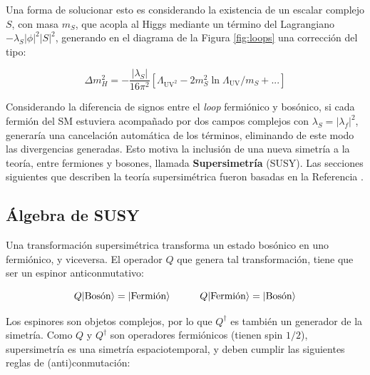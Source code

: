 % 
Una forma de solucionar esto es considerando la existencia de un escalar complejo $S$, con masa $m_S$, que acopla al Higgs mediante un término del Lagrangiano $-\lambda_S |\phi|^2|S|^2$, generando en el diagrama de la Figura \ref{fig:loops} una corrección del tipo:

\begin{equation}
	\Delta m_H^2 = - \frac{|\lambda_S|}{16 \pi^2}\left[\Lambda_{\text{UV}^2} - 2m_S^2 \ln{\Lambda_{\text{UV}}/m_S} + ... \right]
\end{equation}

Considerando la diferencia de signos entre el \textit{loop} fermiónico y bosónico, si cada fermión del SM estuviera acompañado por dos campos complejos con $\lambda_S = |\lambda_f|^2$, generaría una cancelación automática de los términos, eliminando de este modo las divergencias generadas. Esto motiva la inclusión de una nueva simetría a la teoría, entre fermiones y bosones, llamada \textbf{Supersimetría} (SUSY). Las secciones siguientes que describen la teoría supersimétrica fueron basadas en la Referencia \cite{martin}.

\subsection{Álgebra de SUSY}

Una transformación supersimétrica transforma un estado bosónico en uno fermiónico, y viceversa. El operador $Q$ que genera tal transformación, tiene que ser un espinor anticonmutativo:

\begin{equation}
	Q\lvert\text{Bosón}\rangle = \lvert\text{Fermión}\rangle \quad\quad\quad Q\lvert\text{Fermión}\rangle = \lvert\text{Bosón}\rangle
\end{equation}

Los espinores son objetos complejos, por lo que $Q^{\dagger}$ es también un generador de la simetría. Como $Q$ y $Q^{\dagger}$ son operadores fermiónicos (tienen spin $1/2$), supersimetría es una simetría espaciotemporal, y deben cumplir las siguientes reglas de (anti)conmutación:

